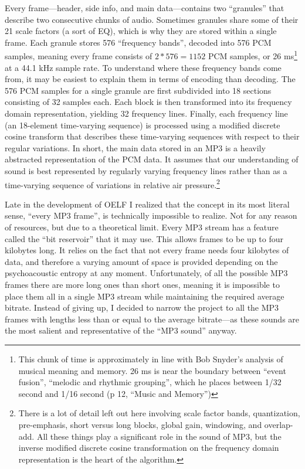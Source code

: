 \documentclass{thesis}
\begin{document}
Every frame---header, side info, and main data---contains two ``granules'' that describe two consecutive chunks of audio. Sometimes granules share some of their 21 scale factors (a sort of EQ), which is why they are stored within a single frame. Each granule stores 576 ``frequency bands'', decoded into 576 PCM samples, meaning every frame consists of $2*576=1152$ PCM samples, or 26 ms\footnote{This chunk of time is approximately in line with Bob Snyder's analysis of musical meaning and memory. 26 ms is near the boundary between ``event fusion'', ``melodic and rhythmic grouping'', which he places between 1/32 second and 1/16 second (p 12, ``Music and Memory'')} at a 44.1 kHz sample rate. To understand where these frequency bands come from, it may be easiest to explain them in terms of encoding than decoding. The 576 PCM samples for a single granule are first subdivided into 18 sections consisting of 32 samples each. Each block is then transformed into its frequency domain representation, yielding 32 frequency lines. Finally, each frequency line (an 18-element time-varying sequence) is processed using a modified discrete cosine transform that describes these time-varying sequences with respect to their regular variations. In short, the main data stored in an MP3 is a heavily abstracted representation of the PCM data. It assumes that our understanding of sound is best represented by regularly varying frequency lines rather than as a time-varying sequence of variations in relative air pressure.\footnote{There is a lot of detail left out here involving scale factor bands, quantization, pre-emphasis, short versus long blocks, global gain, windowing, and overlap-add. All these things play a significant role in the sound of MP3, but the inverse modified discrete cosine transformation on the frequency domain representation is the heart of the algorithm.}

Late in the development of OELF I realized that the concept in its most literal sense, ``every MP3 frame'', is technically impossible to realize. Not for any reason of resources, but due to a theoretical limit. Every MP3 stream has a feature called the ``bit reservoir'' that it may use. This allows frames to be up to four kilobytes long. It relies on the fact that not every frame needs four kilobytes of data, and therefore a varying amount of space is provided depending on the psychoacoustic entropy at any moment. Unfortunately, of all the possible MP3 frames there are more long ones than short ones, meaning it is impossible to place them all in a single MP3 stream while maintaining the required average bitrate. Instead of giving up, I decided to narrow the project to all the MP3 frames with lengths less than or equal to the average bitrate---as these sounds are the most salient and representative of the ``MP3 sound'' anyway.
	
\end{document}

